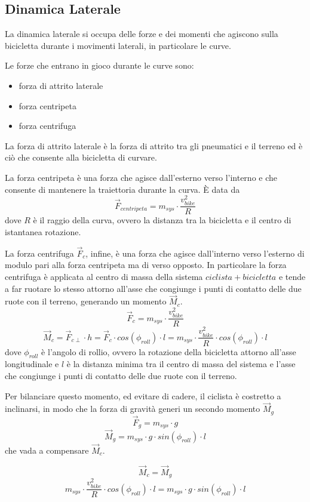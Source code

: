 \documentclass[class=article]{standalone}
\begin{document}
	\subsection{Dinamica Laterale}
	La dinamica laterale si occupa delle forze e dei momenti che agiscono sulla bicicletta durante i movimenti laterali, in particolare le curve.
	
	Le forze che entrano in gioco durante le curve sono:
	\begin{itemize}
		\item forza di attrito laterale
		\item forza centripeta
		\item forza centrifuga
	\end{itemize}
	
	La forza di attrito laterale è la forza di attrito tra gli pneumatici e il terreno ed è ciò che consente alla bicicletta di curvare.
	
	La forza centripeta	è una forza che agisce dall'esterno verso l'interno e che consente di mantenere la traiettoria durante la curva. È data da
	\[\vec{F}_{centripeta}=m_{sys}\cdot\frac{v_{bike}^2}{R}\]
	dove \(R\) è il raggio della curva, ovvero la distanza tra la bicicletta e il centro di istantanea rotazione.
	
	La forza centrifuga \(\vec{F}_{c}\), infine, è una forza che agisce dall'interno verso l'esterno di modulo pari alla forza centripeta ma di verso opposto.
	In particolare la forza centrifuga è applicata al centro di massa della sistema \(ciclista + bicicletta\) e tende a far ruotare lo stesso attorno all'asse che congiunge i punti di contatto delle due ruote con il terreno, generando un momento \(\vec{M}_{c}\).
	\[\vec{F}_{c}=m_{sys}\cdot\frac{v_{bike}^2}{R}\]
	\[\vec{M}_{c}=\vec{F}_{c\perp}\cdot h=\vec{F}_{c}\cdot cos(\phi_{roll})\cdot l=m_{sys}\cdot\frac{v_{bike}^2}{R}\cdot cos(\phi_{roll})\cdot l\]
	dove \(\phi_{roll}\) è l'angolo di rollio, ovvero la rotazione della bicicletta attorno all'asse longitudinale e \(l\) è la distanza minima tra il centro di massa del sistema e l'asse che congiunge i punti di contatto delle due ruote con il terreno.
	
	Per bilanciare questo momento, ed evitare di cadere, il ciclista è costretto a inclinarsi, in modo che la forza di gravità generi un secondo momento \(\vec{M}_{g}\)
		\[\vec{F}_{g}=m_{sys}\cdot g\]
	\[\vec{M}_{g}=m_{sys}\cdot g \cdot sin(\phi_{roll})\cdot l\]
	che vada a compensare \(\vec{M}_{c}\).	

	\[\vec{M}_{c}=\vec{M}_{g}\]
	\[m_{sys}\cdot\frac{v_{bike}^2}{R}\cdot cos(\phi_{roll})\cdot l=m_{sys}\cdot g \cdot sin(\phi_{roll})\cdot l\]
	
\end{document}
